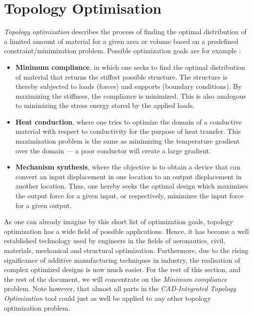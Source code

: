 \section{Topology Optimisation}
\label{sec:TopOpt}
\emph{Topology optimization} describes the process of finding the optimal distribution of a limited amount of material for a given area or volume based on a predefined constraint/minimization problem. Possible optimization goals are for example \cite{Hunter2009}:
\begin{itemize}
\item \textbf{Minimum compliance}, in which one seeks to find the optimal distribution of material that returns the stiffest possible structure. The structure is thereby subjected to loads (forces) and supports (boundary conditions). By maximizing the stiffness, the compliance is minimized. This is also analogous to minimizing the stress energy stored by the applied loads.
\item \textbf{Heat conduction}, where one tries to optimize the domain of a conductive material with respect to conductivity for the purpose of heat transfer. This maximization problem is the same as minimizing the temperature gradient over the domain --- a poor conductor will create a large gradient.
\item \textbf{Mechanism synthesis}, where the objective is to obtain a device that can convert an input displacement in one location to an output displacement in another location. Thus, one hereby seeks the optimal design which maximizes the output force for a given input, or respectively, minimizes the input force for a given output.
\end{itemize}


As one can already imagine by this short list of optimization goals, topology optimization has a wide field of possible applications. Hence, it has become a well established technology used by engineers in the fields of aeronautics, civil, materials, mechanical and structural optimization. Furthermore, due to the rising significance of additive manufacturing techniques in industry, the realisation of complex optimized designs is now much easier. 
For the rest of this section, and the rest of the document, we will concentrate on the \emph{Minimum compliance} problem. Note however, that almost all parts in the \emph{CAD-Integrated Topology Optimization} tool could just as well be applied to any other topology optimization problem. 

